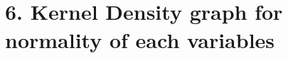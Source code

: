 \documentclass[11pt]{article}
\begin{document}
    \begin{center}
    \end{center}
    { \hspace*{\fill} \\}
    
    \begin{center}
    \end{center}
    { \hspace*{\fill} \\}
    
    \hypertarget{kernel-density-graph-for-normality-of-each-variables}{%
\section{6. Kernel Density graph for normality of each
variables}\label{kernel-density-graph-for-normality-of-each-variables}}
\end{document}
